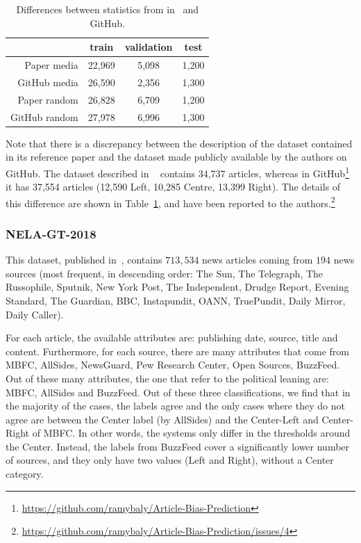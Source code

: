 \begin{table}[!htbp]
    \centering
    \begin{tabular}{r|c|c|c}
                      & train  & validation & test  \\
        \hline
        Paper media   & 22,969 & 5,098      & 1,200 \\
        GitHub media  & 26,590 & 2,356      & 1,300 \\
        \hline
        Paper random  & 26,828 & 6,709      & 1,200 \\
        GitHub random & 27,978 & 6,996      & 1,300
    \end{tabular}
    \caption{Differences between statistics from in~\citet{baly2020we} and GitHub.}
    \label{tab:baly_size}
\end{table}

Note that there is a discrepancy between the description of the dataset contained in its reference paper and the dataset made publicly available by the authors on GitHub.
The dataset described in ~\citet{baly2020we} contains 34,737 articles, whereas in GitHub\footnote{\url{https://github.com/ramybaly/Article-Bias-Prediction}} it has 37,554 articles (12,590 Left, 10,285 Centre, 13,399 Right). The details of this difference are shown in Table~\ref{tab:baly_size}, and have been reported to the authors.\footnote{\url{https://github.com/ramybaly/Article-Bias-Prediction/issues/4}}

\subsubsection{NELA-GT-2018}

This dataset, published in~\citet{DVN/ULHLCB_2019}, contains $713,534$ news articles coming from $194$ news sources (most frequent, in descending order: The Sun, The Telegraph, The Russophile, Sputnik, New York Post, The Independent, Drudge Report, Evening Standard, The Guardian, BBC, Instapundit, OANN, TruePundit, Daily Mirror, Daily Caller).

For each article, the available attributes are: publishing date, source, title and content.
Furthermore, for each source, there are many attributes that come from MBFC, AllSides, NewsGuard, Pew Research Center, Open Sources, BuzzFeed. Out of these many attributes, the one that refer to the political leaning are: MBFC, AllSides and BuzzFeed. Out of these three classifications, we find that in the majority of the cases, the labels agree and the only cases where they do not agree are between the Center label (by AllSides) and the Center-Left and Center-Right of MBFC. In other words, the systems only differ in the thresholds around the Center.
Instead, the labels from BuzzFeed cover a significantly lower number of sources, and they only have two values (Left and Right), without a Center category.

